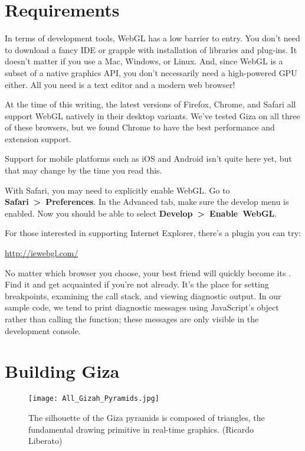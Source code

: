 
\section{Requirements}

In terms of development tools, WebGL has a low barrier to entry. You don't need to download a fancy IDE or grapple with installation of libraries and plug-ins.  It doesn't matter if you use a Mac, Windows, or Linux.  And, since WebGL is a subset of a native graphics API, you don't necessarily need a high-powered GPU either.  All you need is a text editor and a modern web browser!

At the time of this writing, the latest versions of Firefox, Chrome, and Safari all support WebGL natively in their desktop variants.  We've tested Giza on all three of these browsers, but we found Chrome to have the best performance and extension support.

Support for mobile platforms such as iOS and Android isn't quite here  yet, but that may change by the time you read this.

With Safari, you may need to explicitly enable WebGL.  Go to \textbf{Safari~>~Preferences}.  In the Advanced tab, make sure the develop menu is enabled.  Now you should be able to select \textbf{Develop~>~Enable~WebGL}.

For those interested in supporting Internet Explorer, there's a plugin you can try:

\url{http://iewebgl.com/}

No matter which browser you choose, your best friend will quickly become its .  Find it and get acquainted if you're not already.  It's the place for setting breakpoints, examining the call stack, and viewing diagnostic output.  In our sample code, we tend to print diagnostic messages using JavaScript's  object rather than calling the  function; these messages are only visible in the development console.


\section{Building Giza}

\begin{figure}[htb]\centering
  \texttt{[image: All\_Gizah\_Pyramids.jpg]}
  \caption{The silhouette of the Giza pyramids is composed of triangles, the fundamental drawing primitive in real-time graphics. (Ricardo Liberato)}
  \label{fig:Giza}
\end{figure}

